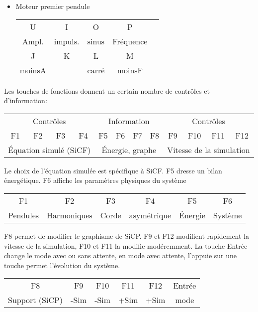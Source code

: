 \begin{itemize}[leftmargin=2cm, label=, itemsep=0pt]%
\item Moteur premier pendule

\hspace{9cm}
\begin{tabular}{ccccc}
\sf U &\sf I &\sf O &\sf P \\
 Ampl. & impuls. & sinus & Fréquence \\
\sf J &\sf K &\sf L &\sf M \\
 moinsA &  & carré & moinsF \\
\end{tabular}
%
\end{itemize}
Les touches de fonctions donnent un certain nombre de contrôles et d'information:
%
\begin{center}
\begin{tabular}{ccccc ccccc cc}
\multicolumn{4}{|c|}{Contrôles} & \multicolumn{4}{c}{Information} & \multicolumn{4}{|c|}{Contrôles}\\
\sf F1 &\sf F2 &\sf F3 &\sf F4 &\sf F5 &\sf F6 &\sf F7 &\sf F8 &\sf F9 &\sf F10 &\sf F11 &\sf F12 \\
\multicolumn{4}{|c|}{Équation simulé (SiCF)} & \multicolumn{4}{c}{Énergie, graphe} & \multicolumn{4}{|c|}{Vitesse de la simulation}\\
\end{tabular}
\end{center}
%
Le choix de l'équation simulée est spécifique à SiCF. {\sf F5} dresse un bilan énergétique. {\sf F6} affiche les paramètres physiques du système
\begin{center}
\begin{tabular}{cccccc}
\sf F1 &\sf F2 &\sf F3 &\sf F4 &\sf F5 &\sf F6\\
Pendules & Harmoniques & Corde & asymétrique & Énergie & Système \\
\end{tabular}
\end{center}
%
F8 permet de modifier  le graphisme de SiCP. {\sf F9} et {\sf F12} modifient rapidement la vitesse de la simulation, {\sf F10} et {\sf F11} la modifie modéremment. La touche {\sf Entrée} change le mode avec ou sans attente, en mode avec attente, l'appuie sur une touche permet l'évolution du système.
\begin{center}
\begin{tabular}{cccccc}
\sf F8 &\sf F9 &\sf F10 &\sf F11 &\sf F12 & \sf Entrée \\
Support (SiCP) & -Sim & -Sim & +Sim & +Sim & mode\\
\end{tabular}
\end{center}
%

